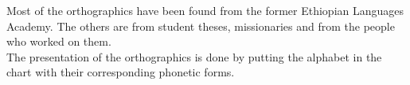 Most of the orthographics have been found from the former Ethiopian
Languages Academy.  The others are from student theses, missionaries and
from the people who worked on them.\\


The presentation of the orthographics is done by putting the alphabet in the
chart with their corresponding phonetic forms.\\

